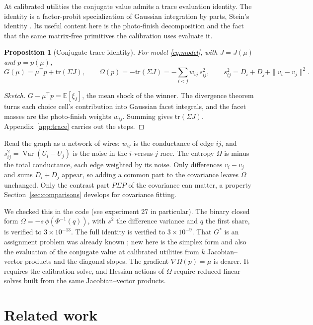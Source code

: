 \documentclass[12pt]{article}
\newtheorem{proposition}{Proposition}
\theoremstyle{remark}
\newcommand{\E}{\mathbb{E}}
\begin{document}
At calibrated utilities the conjugate value admits a trace evaluation
identity. The identity is a factor-probit specialization of Gaussian
integration by parts, Stein's identity \citep{stein1981}. Its useful
content here is the photo-finish decomposition and the fact that the
same matrix-free primitives the calibration uses evaluate it.

\begin{proposition}[Conjugate trace identity]\label{prop:trace}
For model \eqref{eq:model}, with $J = J(\mu)$ and $p = p(\mu)$,
\[
G(\mu) = \mu^\top p + \mathrm{tr}(\Sigma J),
\qquad
\Omega(p) = -\mathrm{tr}(\Sigma J)
= -\sum_{i<j} w_{ij}\, s_{ij}^2, \qquad
s_{ij}^2 = D_i + D_j + \|v_i - v_j\|^2 .
\]
\end{proposition}
\begin{proof}[Sketch]
$G - \mu^\top p = \E[\xi_I]$, the mean shock of the winner. The
divergence theorem turns each choice cell's contribution into Gaussian
facet integrals, and the facet masses are the photo-finish weights
$w_{ij}$. Summing gives $\mathrm{tr}(\Sigma J)$.
Appendix~\ref{app:trace} carries out the steps.
\end{proof}
Read the graph
as a network of wires: $w_{ij}$ is the conductance of
edge $ij$, and $s_{ij}^2 = \operatorname{Var}(U_i - U_j)$ is the noise in the
$i$-versus-$j$ race. The entropy $\Omega$ is minus the total
conductance, each edge weighted by its noise. Only differences $v_i -
v_j$ and sums $D_i + D_j$ appear, so adding a common part to the
covariance leaves $\Omega$ unchanged. Only the contrast part
$P\Sigma P$ of the covariance can matter, a property
Section~\ref{sec:comparisons} develops for covariance fitting.

We checked this in the code (see experiment 27 in particular). The
binary closed form $\Omega = -s\,\phi(\Phi^{-1}(q))$, with $s^2$ the
difference variance and $q$ the first share, is verified to
$3\times10^{-13}$. The full identity is verified to $3\times10^{-9}$. That $G^*$ is an assignment problem was already known \citep{chiong2016}; new here is the simplex form and also the
evaluation of the conjugate value
at calibrated utilities from $k$ Jacobian--vector products and the
diagonal slopes. The gradient $\nabla\Omega(p) = \mu$ is dearer. It
requires the calibration solve, and Hessian actions of $\Omega$ require
reduced linear solves built from the same Jacobian--vector products.


\section{Related work}\label{sec:related}
\end{document}
